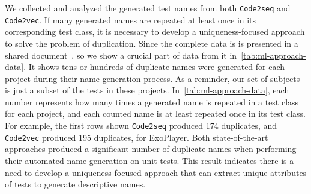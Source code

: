 \begin{appendices}
We collected and analyzed the generated test names from both \texttt{Code2seq} and \texttt{Code2vec}.
%
If many generated names are repeated at least once in its corresponding test class, it is necessary to develop a uniqueness-focused approach to solve the problem of duplication.
%
Since the complete data is is presented in a shared document~\cite{CodeResult}, so we show a crucial part of data from it in~\cref{tab:ml-approach-data}.
%
It shows tens or hundreds of duplicate names were generated for each project during their name generation process.
%
As a reminder, our set of subjects is just a subset of the tests in these projects.
%
In~\cref{tab:ml-approach-data}, each number represents how many times a generated name is repeated in a test class for each project, and each counted name is at least repeated once in its test class.
%
For example, the first rows shown \texttt{Code2seq} produced \num{174} duplicates, and \texttt{Code2vec} produced \num{195} duplicates, for ExoPlayer.
%
Both state-of-the-art approaches produced a significant number of duplicate names when performing their automated name generation on unit tests.
%
This result indicates there is a need to develop a uniqueness-focused approach that can extract unique attributes of tests to generate descriptive names.


\end{appendices}
